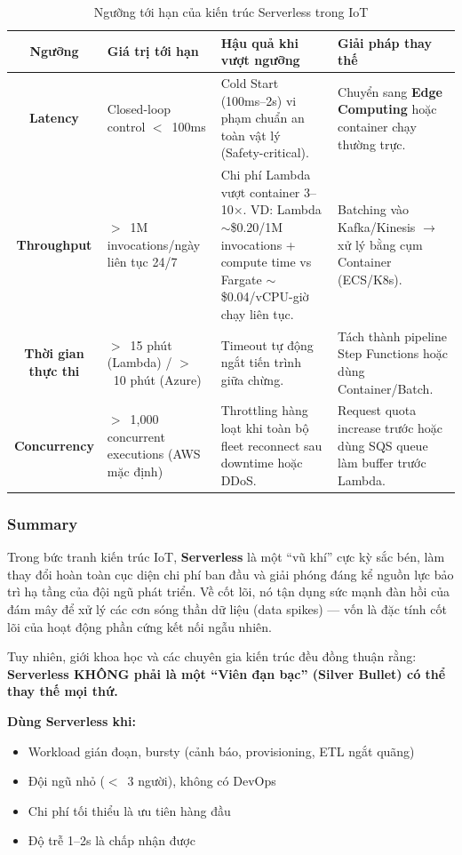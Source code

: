 \begin{table}[H]
\centering
\caption{Ngưỡng tới hạn của kiến trúc Serverless trong IoT}
\begin{tabularx}{\textwidth}{c X X X}
\toprule
\textbf{Ngưỡng} & \textbf{Giá trị tới hạn} & \textbf{Hậu quả khi vượt ngưỡng} & \textbf{Giải pháp thay thế} \\
\hline
\textbf{Latency}
  & Closed-loop control $<$~100ms
  & Cold Start (100ms--2s) vi phạm chuẩn an toàn vật lý (Safety-critical).
  & Chuyển sang \textbf{Edge Computing} hoặc container chạy thường trực. \\
\hline
\textbf{Throughput}
  & $>$~1M invocations/ngày liên tục 24/7
  & Chi phí Lambda vượt container 3--10$\times$. VD: Lambda $\sim$\$0.20/1M invocations + compute time vs Fargate $\sim$\$0.04/vCPU-giờ chạy liên tục.
  & Batching vào Kafka/Kinesis $\rightarrow$ xử lý bằng cụm Container (ECS/K8s). \\
\hline
\textbf{Thời gian thực thi}
  & $>$~15 phút (Lambda) / $>$~10 phút (Azure)
  & Timeout tự động ngắt tiến trình giữa chừng.
  & Tách thành pipeline Step Functions hoặc dùng Container/Batch. \\
\hline
\textbf{Concurrency}
  & $>$~1,000 concurrent executions (AWS mặc định)
  & Throttling hàng loạt khi toàn bộ fleet reconnect sau downtime hoặc DDoS.
  & Request quota increase trước hoặc dùng SQS queue làm buffer trước Lambda. \\
\hline
\end{tabularx}
\end{table}

\subsubsection{Summary}
\label{subsec:serverless-summary}

Trong bức tranh kiến trúc IoT, \textbf{Serverless} là một ``vũ khí'' cực kỳ sắc bén, làm thay đổi hoàn toàn cục diện chi phí ban đầu và giải phóng đáng kể nguồn lực bảo trì hạ tầng của đội ngũ phát triển. Về cốt lõi, nó tận dụng sức mạnh đàn hồi của đám mây để xử lý các cơn sóng thần dữ liệu (data spikes) --- vốn là đặc tính cốt lõi của hoạt động phần cứng kết nối ngẫu nhiên.

Tuy nhiên, giới khoa học và các chuyên gia kiến trúc đều đồng thuận rằng: \textbf{Serverless KHÔNG phải là một ``Viên đạn bạc'' (Silver Bullet) có thể thay thế mọi thứ.}

\noindent\textbf{Dùng Serverless khi:}
\begin{itemize}
    \item Workload gián đoạn, bursty (cảnh báo, provisioning, ETL ngắt quãng)
    \item Đội ngũ nhỏ ($<$~3 người), không có DevOps
    \item Chi phí tối thiểu là ưu tiên hàng đầu
    \item Độ trễ 1--2s là chấp nhận được
\end{itemize}

